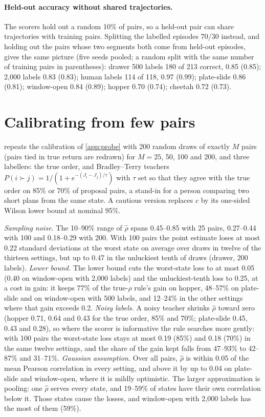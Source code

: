\documentclass{article}
\theoremstyle{plain}
\theoremstyle{remark}
\begin{document}
\paragraph{Held-out accuracy without shared trajectories.} The scorers hold out a random 10\% of pairs, so a held-out
pair can share trajectories with training pairs. Splitting the labelled episodes 70/30 instead, and holding out the
pairs whose two segments both come from held-out episodes, gives the same picture (five seeds pooled; a random split
with the same number of training pairs in parentheses): drawer 500 labels 180 of 213 correct, 0.85 (0.85); 2,000 labels
0.83 (0.83); human labels 114 of 118, 0.97 (0.99); plate-slide 0.86 (0.81); window-open 0.84 (0.89); hopper 0.70
(0.74); cheetah 0.72 (0.73).

\section{Calibrating from few pairs}
\label{app:calib}



 repeats the calibration of \cref{app:probe} with 200 random draws of exactly $M$ pairs (pairs tied in
true return are redrawn) for $M=25$, 50, 100 and 200, and three labellers: the true order, and Bradley--Terry teachers
$P(i\succ j)=1/(1+e^{-(J_i-J_j)/\tau})$ with $\tau$ set so that they agree with the true order on 85\% or 70\% of
proposal pairs, a stand-in for a person comparing two short plans from the same state. A cautious version replaces $c$
by its one-sided Wilson lower bound at nominal 95\%.

\emph{Sampling noise.} The 10--90\% range of $\hat\rho$ spans 0.45--0.85 with 25 pairs, 0.27--0.44 with 100 and
0.18--0.29 with 200. With 100 pairs the point estimate loses at most 0.22 standard deviations at the worst state on
average over draws in twelve of the thirteen settings, but up to 0.47 in the unluckiest tenth of draws (drawer, 200
labels). \emph{Lower bound.} The lower bound cuts the worst-state loss to at most 0.05 (0.40 on window-open with 2,000
labels) and the unluckiest-tenth loss to 0.25, at a cost in gain: it keeps 77\% of the true-$\rho$ rule's gain on
hopper, 48--57\% on plate-slide and on window-open with 500 labels, and 12--24\% in the other settings where that gain
exceeds 0.2. \emph{Noisy labels.} A noisy teacher shrinks $\hat\rho$ toward zero (hopper 0.71, 0.64 and 0.43 for the
true order, 85\% and 70\%; plate-slide 0.45, 0.43 and 0.28), so where the scorer is informative the rule searches more
gently: with 100 pairs the worst-state loss stays at most 0.19 (85\%) and 0.18 (70\%) in the same twelve settings, and
the share of the gain kept falls from 47--93\% to 42--87\% and 31--71\%. \emph{Gaussian assumption.} Over all pairs,
$\hat\rho$ is within 0.05 of the mean Pearson correlation in every setting, and above it by up to 0.04 on plate-slide
and window-open, where it is mildly optimistic. The larger approximation is pooling: one $\hat\rho$ serves every state,
and 19--59\% of states have their own correlation below it. Those states cause the losses, and window-open with 2,000
labels has the most of them (59\%).
\end{document}
